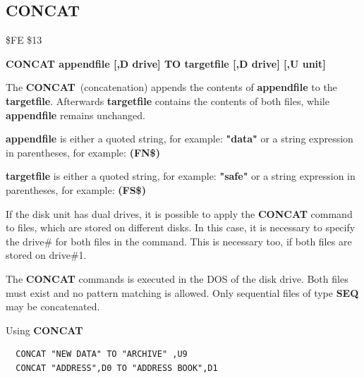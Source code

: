 \subsection{CONCAT}
\begin{description}[leftmargin=2cm,style=nextline]
\item [Token:] \$FE \$13
\item [Format:] {\bf CONCAT appendfile [,D drive] TO
                targetfile [,D drive] [,U unit] }
\item [Usage:]
   The {\bf CONCAT} (concatenation) appends the contents of
   {\bf appendfile} to the {\bf targetfile}. Afterwards {\bf targetfile}
   contains the contents of both files, while {\bf appendfile}
   remains unchanged.

   {\bf appendfile} is either a quoted string, for example: {\bf "data"} or
   a string expression in parentheses, for example: {\bf (FN\$)}

   {\bf targetfile} is either a quoted string, for example: {\bf "safe"} or
   a string expression in parentheses, for example: {\bf (FS\$)}

   If the disk unit has dual drives, it is possible to apply
   the {\bf CONCAT} command to files, which are stored on different
   disks. In this case, it is necessary to specify the drive\#
   for both files in the command. This is necessary too, if both
   files are stored on drive\#1.

   \drivedefinition

   \unitdefinition

\item [Remarks:]
   The {\bf CONCAT} commands is executed in the DOS of the disk drive.
   Both files must exist and no pattern matching is allowed.
   Only sequential files of type {\bf SEQ} may be concatenated.

\item [Example:] Using {\bf CONCAT}
\begin{tcolorbox}[colback=black,coltext=white]
\verbatimfont{\codefont}
\begin{verbatim}
  CONCAT "NEW DATA" TO "ARCHIVE" ,U9
  CONCAT "ADDRESS",D0 TO "ADDRESS BOOK",D1
\end{verbatim}
\end{tcolorbox}
\end{description}


\newpage
